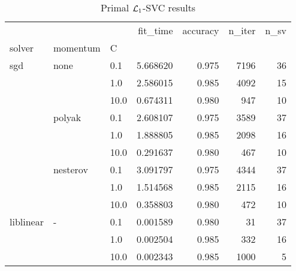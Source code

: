 \begin{table}[H]
\centering
\caption{Primal $\protect \mathcal{L}_1$-SVC results}
\label{primal_l1_svc_cv_results}
\begin{tabular}{lllrrrr}
\toprule
          &   &      &  fit\_time &  accuracy &  n\_iter &  n\_sv \\
solver & momentum & C &           &           &         &       \\
\midrule
sgd & none & 0.1  &  5.668620 &     0.975 &    7196 &    36 \\
          &   & 1.0  &  2.586015 &     0.985 &    4092 &    15 \\
          &   & 10.0 &  0.674311 &     0.980 &     947 &    10 \\
          & polyak & 0.1  &  2.608107 &     0.975 &    3589 &    37 \\
          &   & 1.0  &  1.888805 &     0.985 &    2098 &    16 \\
          &   & 10.0 &  0.291637 &     0.980 &     467 &    10 \\
          & nesterov & 0.1  &  3.091797 &     0.975 &    4344 &    37 \\
          &   & 1.0  &  1.514568 &     0.985 &    2115 &    16 \\
          &   & 10.0 &  0.358803 &     0.980 &     472 &    10 \\
liblinear & - & 0.1  &  0.001589 &     0.980 &      31 &    37 \\
          &   & 1.0  &  0.002504 &     0.985 &     332 &    16 \\
          &   & 10.0 &  0.002343 &     0.985 &    1000 &     5 \\
\bottomrule
\end{tabular}
\end{table}
